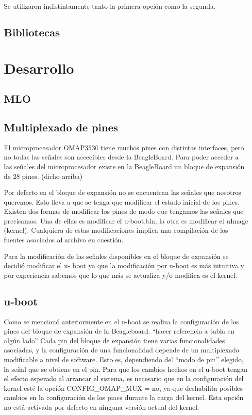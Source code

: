 \bigskip
Se utilizaron indistintamente tanto la primera opción como la segunda.

\subsection{Bibliotecas}

\section{Desarrollo}
\subsection{MLO}
\subsection{Multiplexado de pines}
El microprocesador OMAP3530 tiene muchos pines con distintas interfaces, pero no todas las 
señales son accecibles desde la BeagleBoard. Para poder acceder a las señales del microprocesador 
existe en la BeagleBoard un bloque de expansión de 28 pines. (dicho arriba)

Por defecto en el bloque de expansión no se encuentran las señales que nosotros queremos. Esto 
lleva a que se tenga que modificar el estado inicial de los pines. 
Existen dos formas de modificar los pines de modo que tengamos las señales que precisamos. Una 
de ellas es modificar el u-boot.bin, la otra es modificar el uImage (kernel). Cualquiera de estas modificaciones implica una compilación de los fuentes asociados al archivo en cuestión. 

Para la modificación de las señales disponibles en el bloque de expansión se decidió modificar el u- 
boot ya que la modificación por u-boot es más intuitiva y por experiencia sabemos que lo que más se actualiza y/o modifica es el kernel. 

\subsection{u-boot}
Como se mencionó anteriormente en el u-boot se realiza la configuración de los pines del bloque de expansión de la Beagleboard. “hacer referencia a tabla en algún lado”
Cada pin del bloque de expansión tiene varias funcionalidades asociadas, y la configuración de una 
funcionalidad depende de un multiplexado modificable a nivel de software. Esto es, dependiendo del “modo de pin” elegido, la señal que se obtiene en el pin.
Para que los cambios hechos en el u-boot tengan el efecto esperado al arrancar el sistema, es necesario que en la configuración del kernel esté la opción CONFIG\_OMAP\_MUX = no, ya que deshabilita posibles cambios en la configuración de los pines durante la carga del kernel. Esta opción no está activada por defecto en ninguna versión actual del kernel. 

